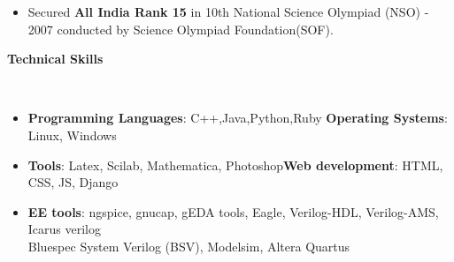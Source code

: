 \documentclass[a4paper,11pt]{article}
\newcommand{\lsep}{-0.5cm}
\newcommand{\resheading}[1]{{\small \colorbox{mygrey}{\begin{minipage}{0.975\textwidth}{\textbf{#1 \vphantom{p\^{E}}}}\end{minipage}}}}
\begin{document}
\begin{itemize}
  \item Secured \textbf{All India Rank 15} in 10th National Science Olympiad (NSO) - 2007 conducted by Science Olympiad Foundation(SOF).
\end{itemize}

\resheading{\textbf{\large Technical Skills}}\\[\lsep]
\begin{itemize}
   \item \textbf{Programming Languages}: C++,Java,Python,Ruby \hfill \textbf{Operating Systems}: Linux, Windows\\[-0.6cm]
  \item \textbf{Tools}: Latex, Scilab, Mathematica, Photoshop\hfill \textbf{Web development}: HTML, CSS, JS, Django\\[-0.6cm]
  \item \textbf{EE tools}: ngspice, gnucap,  gEDA tools, Eagle, Verilog-HDL, Verilog-AMS, Icarus verilog \\ \hspace*{1.5cm} Bluespec System Verilog (BSV), Modelsim, Altera Quartus
\end{itemize}
\end{document}
